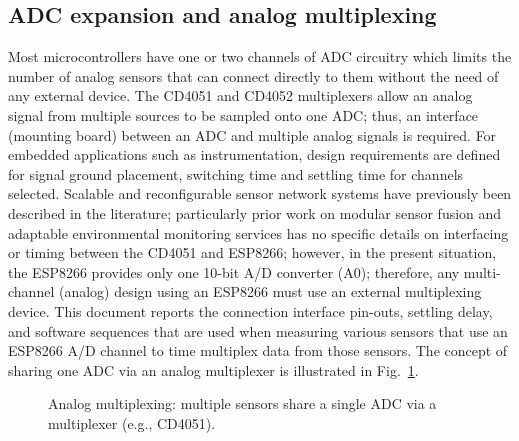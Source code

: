 \documentclass[journal,onecolumn]{IEEEtran}
\begin{document}
\subsection{ADC expansion and analog multiplexing}
Most microcontrollers have one or two channels of ADC circuitry which limits the number of analog sensors that can connect directly to them without the need of any external device. The CD4051 and CD4052 multiplexers allow an analog signal from multiple sources to be sampled onto one ADC; thus, an interface (mounting board) between an ADC and multiple analog signals is required. For embedded applications such as instrumentation, design requirements are defined for signal ground placement, switching time and settling time for channels selected. Scalable and reconfigurable sensor network systems have previously been described in the literature; particularly prior work on modular sensor fusion and adaptable environmental monitoring services \cite{modularsensors2022} has no specific details on interfacing or timing between the CD4051 and ESP8266; however, in the present situation, the ESP8266 provides only one 10-bit A/D converter (A0); therefore, any multi-channel (analog) design using an ESP8266 must use an external multiplexing device. This document reports the connection interface pin-outs, settling delay, and software sequences that are used when measuring various sensors that use an ESP8266 A/D channel to time multiplex data from those sensors. The concept of sharing one ADC via an analog multiplexer is illustrated in Fig.~\ref{fig:lit-adc-mux}.

\begin{figure}[h]
\centering
{}
\caption{Analog multiplexing: multiple sensors share a single ADC via a multiplexer (e.g., CD4051).}
\label{fig:lit-adc-mux}
\end{figure}
\end{document}
